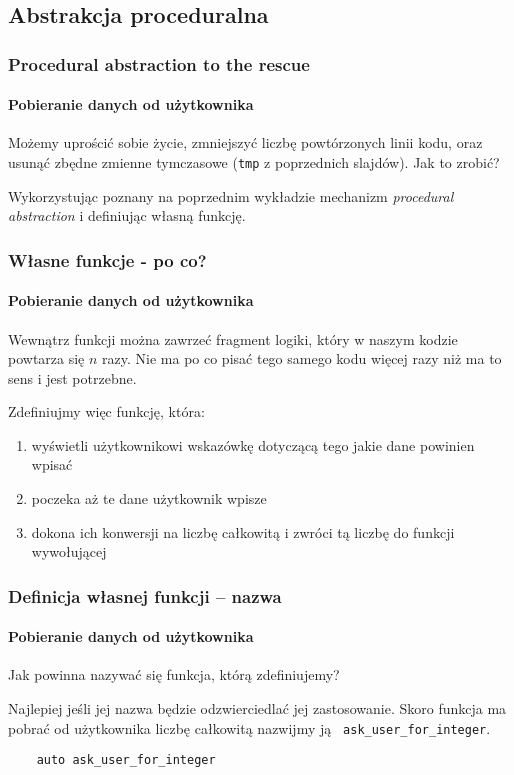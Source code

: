 \documentclass[aspectratio=169]{beamer}
\begin{document}
\subsection{Abstrakcja proceduralna}

\begin{frame}
    \frametitle{Procedural abstraction to the rescue}
    \framesubtitle{Pobieranie danych od użytkownika}

    Możemy uprościć sobie życie, zmniejszyć liczbę powtórzonych linii kodu, oraz
    usunąć zbędne zmienne tymczasowe ({\tt tmp} z poprzednich slajdów). Jak to
    zrobić?

    Wykorzystując poznany na poprzednim wykładzie mechanizm \emph{procedural
    abstraction} i definiując własną funkcję.
\end{frame}

\begin{frame}
    \frametitle{Własne funkcje - po co?}
    \framesubtitle{Pobieranie danych od użytkownika}

    Wewnątrz funkcji można zawrzeć fragment logiki, który w naszym kodzie
    powtarza się $n$ razy. Nie ma po co pisać tego samego kodu więcej razy niż
    ma to sens i jest potrzebne.

    Zdefiniujmy więc funkcję, która:
    \begin{enumerate}
        \item wyświetli użytkownikowi wskazówkę dotyczącą tego jakie dane powinien wpisać
        \item poczeka aż te dane użytkownik wpisze
        \item dokona ich konwersji na liczbę całkowitą i zwróci tą liczbę do
            funkcji wywołującej
    \end{enumerate}
\end{frame}

\begin{frame}[fragile]
    \frametitle{Definicja własnej funkcji -- nazwa}
    \framesubtitle{Pobieranie danych od użytkownika}

    Jak powinna nazywać się funkcja, którą zdefiniujemy?

    Najlepiej jeśli jej nazwa będzie odzwierciedlać jej zastosowanie. Skoro
    funkcja ma pobrać od użytkownika liczbę całkowitą nazwijmy ją {\tt
    ask\_user\_for\_integer}.

    \begin{lstlisting}
    auto ask_user_for_integer
    \end{lstlisting}
\end{frame}
\end{document}
